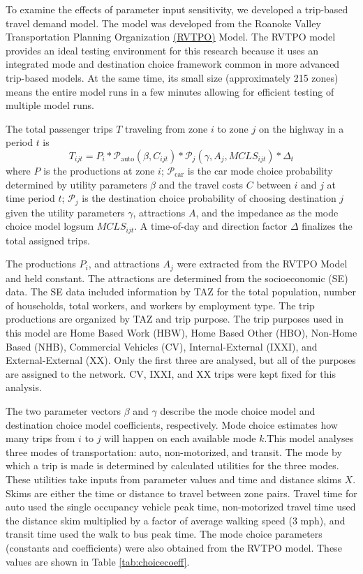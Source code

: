 \documentclass[fancy, masters, twoside]{byuthesis}
\begin{document}
To examine the effects of parameter input sensitivity, we developed a trip-based travel demand model. The model was developed from the Roanoke Valley Transportation Planning Organization \href{https://github.com/xinwangvdot/rvtpo}{(RVTPO)} Model. The RVTPO model provides an ideal testing environment for this research because it uses an integrated mode and destination choice framework common in more advanced trip-based models. At the same time, its small size (approximately 215 zones) means the entire model runs in a few minutes allowing for efficient testing of multiple model runs.

The total passenger trips \(T\) traveling from zone \(i\) to zone \(j\) on the highway in a period \(t\) is
\begin{equation}
T_{ijt} = P_i * \mathcal{P}_{\mathrm{auto}}(\beta, C_{ijt}) * \mathcal{P}_j(\gamma, A_j, MCLS_{ijt}) * \Delta_t
\label{eq:trips}
\end{equation}
where \(P\) is the productions at zone \(i\); \(\mathcal{P}_{\mathrm{car}}\) is the car mode choice probability determined by utility parameters \(\beta\) and the travel costs \(C\) between \(i\) and \(j\) at time period \(t\); \(\mathcal{P}_{j}\) is the destination choice probability of choosing destination \(j\) given the utility parameters \(\gamma\), attractions \(A\), and the impedance as the mode choice model logsum \(MCLS_{ijt}\). A time-of-day and direction factor \(\Delta\) finalizes the total assigned trips.

The productions \(P_i\), and attractions \(A_j\) were extracted from the RVTPO Model and held constant. The attractions are determined from the socioeconomic (SE) data. The SE data included information by TAZ for the total population, number of households, total workers, and workers by employment type. The trip productions are organized by TAZ and trip purpose. The trip purposes used in this model are Home Based Work (HBW), Home Based Other (HBO), Non-Home Based (NHB), Commercial Vehicles (CV), Internal-External (IXXI), and External-External (XX). Only the first three are analysed, but all of the purposes are assigned to the network. CV, IXXI, and XX trips were kept fixed for this analysis.

The two parameter vectors \(\beta\) and \(\gamma\) describe the mode choice model and destination choice model coefficients, respectively. Mode choice estimates how many trips from \(i\) to \(j\) will happen on each available mode \(k\).This model analyses three modes of transportation: auto, non-motorized, and transit. The mode by which a trip is made is determined by calculated utilities for the three modes. These utilities take inputs from parameter values and time and distance skims \(X\). Skims are either the time or distance to travel between zone pairs. Travel time for auto used the single occupancy vehicle peak time, non-motorized travel time used the distance skim multiplied by a factor of average walking speed (3 mph), and transit time used the walk to bus peak time. The mode choice parameters (constants and coefficients) were also obtained from the RVTPO model. These values are shown in Table \ref{tab:choicecoeff}.
\end{document}
